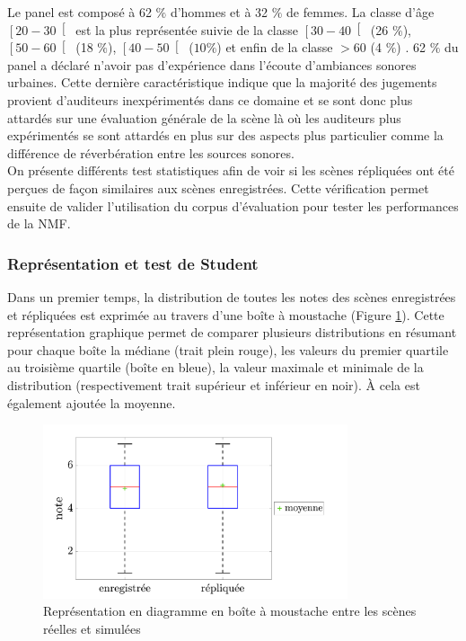 Le panel est composé à 62 $\%$ d'hommes et à 32 $\%$ de femmes. La classe d'âge $\left[20-30\right[$ est la plus représentée suivie de la classe $\left[30-40\right[$ (26 $\%$), $\left[50-60\right[$ (18 $\%$), $\left[40-50\right[$ ($10\%$) et enfin de la classe $>60$ (4 $\%$) . 62 $\%$ du panel a déclaré n'avoir pas d'expérience dans l'écoute d'ambiances sonores urbaines. Cette dernière caractéristique indique que la majorité des jugements provient d'auditeurs inexpérimentés dans ce domaine et se sont donc plus attardés sur une évaluation générale de la scène là où les auditeurs plus expérimentés se sont attardés en plus sur des aspects plus particulier comme la différence de réverbération entre les sources sonores. \\


On présente différents test statistiques afin de voir si les scènes répliquées ont été perçues de façon similaires aux scènes enregistrées. Cette vérification permet ensuite de valider l'utilisation du corpus d'évaluation pour tester les performances de la NMF.

\subsubsection{Représentation et test de Student}

Dans un premier temps, la distribution de toutes les notes des scènes enregistrées et répliquées est exprimée au travers d'une boîte à moustache (Figure \ref{fig:ANOVA_scene}). Cette représentation graphique permet de comparer plusieurs distributions en résumant pour chaque boîte la médiane (trait plein rouge), les valeurs du  premier quartile au troisième quartile (boîte en bleue), la valeur maximale et minimale de la distribution (respectivement trait supérieur et inférieur en noir). \`A cela est également ajoutée la moyenne.\\

\begin{figure}[h]
\centering
\includegraphics[width = 0.8\textwidth]{./figures/test_perceptif/testPerceptif_boxplotType.pdf}
\caption{Représentation en diagramme en boîte à moustache entre les scènes réelles et simulées}\label{fig:ANOVA_scene}
\end{figure}

